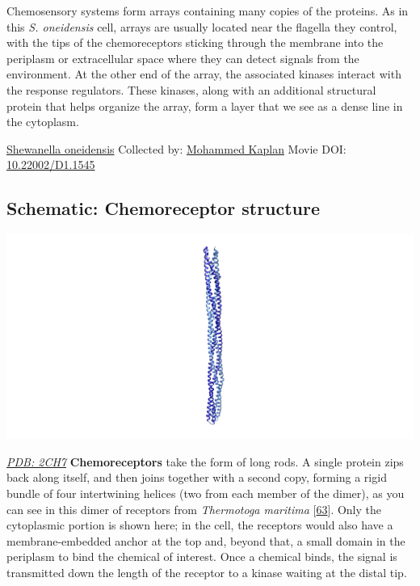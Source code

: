 \documentclass[]{tufte-book}
\begin{document}
Chemosensory systems form arrays containing many copies of the proteins. As in this \emph{S. oneidensis} cell, arrays are usually located near the flagella they control, with the tips of the chemoreceptors sticking through the membrane into the periplasm or extracellular space where they can detect signals from the environment. At the other end of the array, the associated kinases interact with the response regulators. These kinases, along with an additional structural protein that helps organize the array, form a layer that we see as a dense line in the cytoplasm.



\hypertarget{htmlwidget-fde75327d9d608cf2c0c}{}

\label{fig:7-1}\protect\hyperlink{tree}{Shewanella oneidensis} Collected by: \protect\hyperlink{mohammed_kaplan}{Mohammed Kaplan} Movie DOI: \href{https://doi.org/10.22002/D1.1545}{10.22002/D1.1545}

\hypertarget{Chemoreceptor_structure}{%
\subsection*{Schematic: Chemoreceptor structure}\label{Chemoreceptor_structure}}

\includegraphics{img/schematics/7_1_1}

\href{http://rcsb.org/structure/2CH7}{\emph{PDB: 2CH7}}
\textbf{Chemoreceptors} take the form of long rods. A single protein zips back along itself, and then joins together with a second copy, forming a rigid bundle of four intertwining helices (two from each member of the dimer), as you can see in this dimer of receptors from \emph{Thermotoga maritima} {[}\protect\hyperlink{ref-park2006}{63}{]}. Only the cytoplasmic portion is shown here; in the cell, the receptors would also have a membrane-embedded anchor at the top and, beyond that, a small domain in the periplasm to bind the chemical of interest. Once a chemical binds, the signal is transmitted down the length of the receptor to a kinase waiting at the distal tip.
\end{document}
